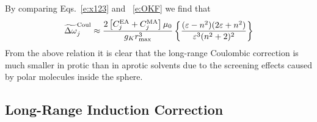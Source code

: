 \documentclass[b5paper,oneside,fleqn,11pt]{book}
\begin{document}
\begin{refsection}
%
By comparing Eqs.~\eqref{e:x123} and ~\eqref{e:OKF}
we find that
%
\begin{equation} \label{e:x1234}
 \widetilde{\Delta \omega}_j^{\rm Coul} \approx 
\frac{2\left[ C^{\rm EA}_j + C^{\rm MA}_j \right]\mu_0}{g_Kr_{\rm max}^3}  
\left\{
\frac{(\varepsilon-n^2)(2\varepsilon+n^2)}{\varepsilon^3(n^2+2)^2}
\right\}
\end{equation}
%
From the above relation it is clear that the long\hyp{}range
Coulombic correction is much smaller in protic 
than in aprotic solvents due to the screening effects
caused by polar molecules inside the sphere.

\subsection{Long\hyp{}Range Induction Correction}


\end{refsection}
\end{document}
